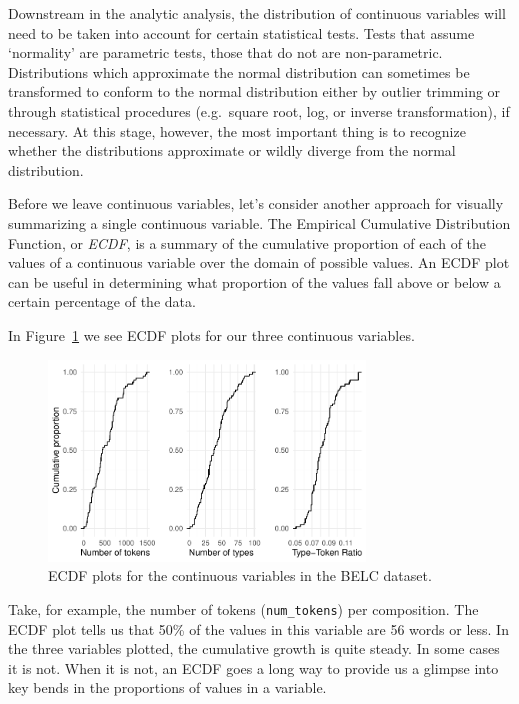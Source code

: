 \documentclass[
  letterpaper,
]{latex/krantz}
\begin{document}
Downstream in the analytic analysis, the distribution of continuous
variables will need to be taken into account for certain statistical
tests. Tests that assume `normality' are parametric tests, those that do
not are non-parametric. Distributions which approximate the normal
distribution can sometimes be transformed to conform to the normal
distribution either by outlier trimming or through statistical
procedures (e.g.~square root, log, or inverse transformation), if
necessary. At this stage, however, the most important thing is to
recognize whether the distributions approximate or wildly diverge from
the normal distribution.

Before we leave continuous variables, let's consider another approach
for visually summarizing a single continuous variable. The Empirical
Cumulative Distribution Function, or \emph{ECDF}, is a summary of the
cumulative proportion of each of the values of a continuous variable
over the domain of possible values. An ECDF plot can be useful in
determining what proportion of the values fall above or below a certain
percentage of the data.

In Figure~\ref{fig-summarize-ecdf-belc} we see ECDF plots for our three
continuous variables.

\begin{figure}[h]

{\centering \includegraphics[width=0.75\textwidth,height=\textheight]{approaching-analysis_files/figure-pdf/fig-summarize-ecdf-belc-1.pdf}

}

\caption{\label{fig-summarize-ecdf-belc}ECDF plots for the continuous
variables in the BELC dataset.}

\end{figure}

Take, for example, the number of tokens (\texttt{num\_tokens}) per
composition. The ECDF plot tells us that 50\% of the values in this
variable are 56 words or less. In the three variables plotted, the
cumulative growth is quite steady. In some cases it is not. When it is
not, an ECDF goes a long way to provide us a glimpse into key bends in
the proportions of values in a variable.
\end{document}
